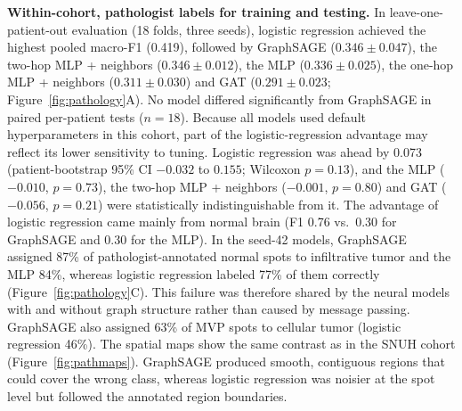 \documentclass[11pt,letterpaper]{article}
\begin{document}
\textbf{Within-cohort, pathologist labels for training and testing.} In leave-one-patient-out evaluation (18 folds, three seeds), logistic regression achieved the highest pooled macro-F1 (0.419), followed by GraphSAGE ($0.346 \pm 0.047$), the two-hop MLP + neighbors ($0.346 \pm 0.012$), the MLP ($0.336 \pm 0.025$), the one-hop MLP + neighbors ($0.311 \pm 0.030$) and GAT ($0.291 \pm 0.023$; Figure~\ref{fig:pathology}A). No model differed significantly from GraphSAGE in paired per-patient tests ($n = 18$). Because all models used default hyperparameters in this cohort, part of the logistic-regression advantage may reflect its lower sensitivity to tuning. Logistic regression was ahead by 0.073 (patient-bootstrap 95\% CI $-0.032$ to $0.155$; Wilcoxon $p = 0.13$), and the MLP ($-0.010$, $p = 0.73$), the two-hop MLP + neighbors ($-0.001$, $p = 0.80$) and GAT ($-0.056$, $p = 0.21$) were statistically indistinguishable from it. The advantage of logistic regression came mainly from normal brain (F1 0.76 vs.\ 0.30 for GraphSAGE and 0.30 for the MLP). In the seed-42 models, GraphSAGE assigned 87\% of pathologist-annotated normal spots to infiltrative tumor and the MLP 84\%, whereas logistic regression labeled 77\% of them correctly (Figure~\ref{fig:pathology}C). This failure was therefore shared by the neural models with and without graph structure rather than caused by message passing. GraphSAGE also assigned 63\% of MVP spots to cellular tumor (logistic regression 46\%). The spatial maps show the same contrast as in the SNUH cohort (Figure~\ref{fig:pathmaps}). GraphSAGE produced smooth, contiguous regions that could cover the wrong class, whereas logistic regression was noisier at the spot level but followed the annotated region boundaries.
\end{document}
